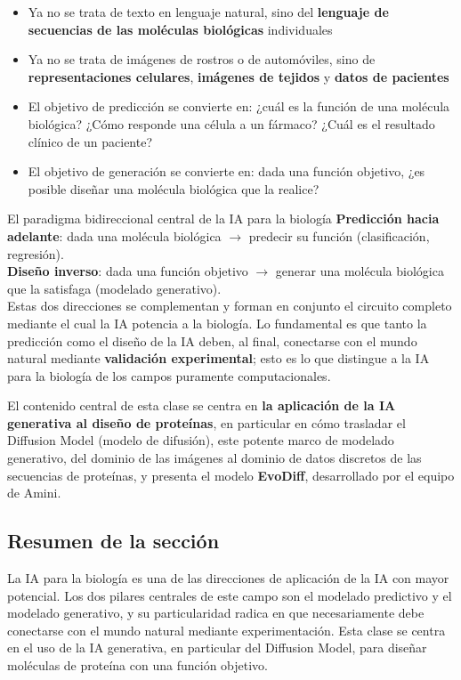 \begin{itemize}
    \item Ya no se trata de texto en lenguaje natural, sino del \textbf{lenguaje de secuencias de las moléculas biológicas} individuales
    \item Ya no se trata de imágenes de rostros o de automóviles, sino de \textbf{representaciones celulares}, \textbf{imágenes de tejidos} y \textbf{datos de pacientes}
    \item El objetivo de predicción se convierte en: ¿cuál es la función de una molécula biológica? ¿Cómo responde una célula a un fármaco? ¿Cuál es el resultado clínico de un paciente?
    \item El objetivo de generación se convierte en: dada una función objetivo, ¿es posible diseñar una molécula biológica que la realice?
\end{itemize}

\begin{importantbox}{El paradigma bidireccional central de la IA para la biología}
\textbf{Predicción hacia adelante}: dada una molécula biológica $\rightarrow$ predecir su función (clasificación, regresión).\\
\textbf{Diseño inverso}: dada una función objetivo $\rightarrow$ generar una molécula biológica que la satisfaga (modelado generativo).\\
Estas dos direcciones se complementan y forman en conjunto el circuito completo mediante el cual la IA potencia a la biología. Lo fundamental es que tanto la predicción como el diseño de la IA deben, al final, conectarse con el mundo natural mediante \textbf{validación experimental}; esto es lo que distingue a la IA para la biología de los campos puramente computacionales.
\end{importantbox}

El contenido central de esta clase se centra en \textbf{la aplicación de la IA generativa al diseño de proteínas}, en particular en cómo trasladar el Diffusion Model (modelo de difusión), este potente marco de modelado generativo, del dominio de las imágenes al dominio de datos discretos de las secuencias de proteínas, y presenta el modelo \textbf{EvoDiff}, desarrollado por el equipo de Amini.

\subsection{Resumen de la sección}

La IA para la biología es una de las direcciones de aplicación de la IA con mayor potencial. Los dos pilares centrales de este campo son el modelado predictivo y el modelado generativo, y su particularidad radica en que necesariamente debe conectarse con el mundo natural mediante experimentación. Esta clase se centra en el uso de la IA generativa, en particular del Diffusion Model, para diseñar moléculas de proteína con una función objetivo.

